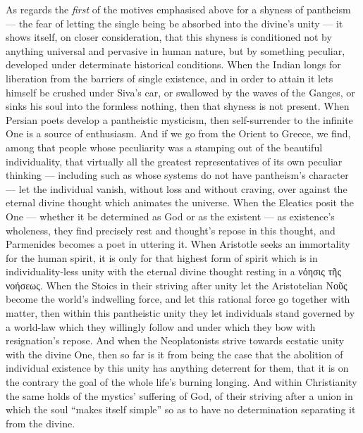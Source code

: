 \documentclass[12pt,a4paper]{book}
\begin{document}
As regards the \emph{first} of the motives emphasised above for a shyness of
pantheism --- the fear of letting the single being be absorbed into the
divine's unity --- it shows itself, on closer consideration, that this shyness
is conditioned not by anything universal and pervasive in human nature, but by
something peculiar, developed under determinate historical conditions. When
the Indian longs for liberation from the barriers of single existence, and in
order to attain it lets himself be crushed under Siva's car, or swallowed by
the waves of the Ganges, or sinks his soul into the formless nothing, then
that shyness is not present. When Persian poets develop a pantheistic
mysticism, then self-surrender to the infinite One is a source of enthusiasm.
And if we go from the Orient to Greece, we find, among that people whose
peculiarity was a stamping out of the beautiful individuality, that virtually
all the greatest representatives of its own peculiar thinking --- including
such as whose systems do not have pantheism's character --- let the individual
vanish, without loss and without craving, over against the eternal divine
thought which animates the universe. When the Eleatics posit the One ---
whether it be determined as God or as the existent --- as existence's
wholeness, they find precisely rest and thought's repose in this thought, and
Parmenides becomes a poet in uttering it. When Aristotle seeks an immortality
for the human spirit, it is only for that
highest form of spirit which is in individuality-less unity with the eternal
divine thought resting in a νόησις τῆς νοήσεως. When the Stoics in their
striving after unity let the Aristotelian Νοῦς become the world's indwelling
force, and let this rational force go together with matter, then within this
pantheistic unity they let individuals stand governed by a world-law which
they willingly follow and under which they bow with resignation's repose. And
when the Neoplatonists strive towards ecstatic unity with the divine One, then
so far is it from being the case that the abolition of individual existence by
this unity has anything deterrent for them, that it is on the contrary the
goal of the whole life's burning longing. And within Christianity the same
holds of the mystics' suffering of God, of their striving after a union in
which the soul ``makes itself simple'' so as to have no determination
separating it from the divine.
\end{document}
